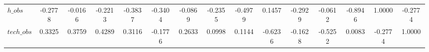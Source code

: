 \begin{center}
\begin{longtable}{lcccccccccccccc}
$h\_obs         $	 & 	          -0.2778	 & 	          -0.0166	 & 	          -0.2213	 & 	          -0.3837	 & 	          -0.3404	 & 	          -0.0869	 & 	          -0.2355	 & 	          -0.4979	 & 	           0.1457	 & 	          -0.2929	 & 	          -0.0612	 & 	          -0.8946	 & 	           1.0000	 & 	          -0.2774 \\ 
$tech\_obs      $	 & 	           0.3325	 & 	           0.3759	 & 	           0.4289	 & 	           0.3116	 & 	          -0.1776	 & 	           0.2633	 & 	           0.0998	 & 	           0.1144	 & 	          -0.6236	 & 	          -0.1628	 & 	          -0.5252	 & 	           0.0083	 & 	          -0.2774	 & 	           1.0000 \\ 
\end{longtable}
 \end{center}
